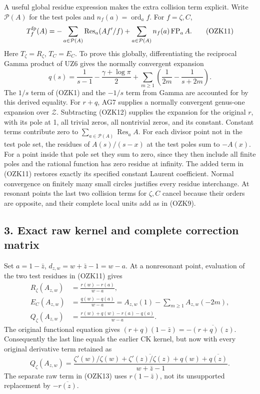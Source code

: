 \documentclass[
  10pt,
  a4paper,
]{article}
\begin{document}
A useful global residue expression makes the extra collision term
explicit. Write \(\mathcal P(A)\) for the test poles and
\(n_f(a)=\operatorname{ord}_a f\). For \(f=\zeta,C\), \[
T_f^{\rm fp}(A)
=-\sum_{a\in\mathcal P(A)}\operatorname{Res}_a(Af'/f)
+\sum_{a\in\mathcal P(A)}n_f(a)\operatorname{FP}_aA.
\tag{OZK11}
\] Here \(T_\zeta=R_\zeta\), \(T_C=E_C\). To prove this globally,
differentiating the reciprocal Gamma product of UZ6 gives the normally
convergent expansion \[
q(s)=\frac1{s-1}-\frac{\gamma+\log\pi}{2}
 +\sum_{m\ge1}\left(\frac1{2m}-\frac1{s+2m}\right).
\tag{OZK12}
\] The \(1/s\) term of (OZK1) and the \(-1/s\) term from Gamma are
accounted for by this derived equality. For \(r+q\), AG7 supplies a
normally convergent genus-one expansion over \(\mathcal Z\). Subtracting
(OZK12) supplies the expansion for the original \(r\), with its pole at
1, all trivial zeros, all nontrivial zeros, and its constant. Constant
terms contribute zero to
\(\sum_{a\in\mathcal P(A)}\operatorname{Res}_a A\). For each divisor
point not in the test pole set, the residues of \(A(s)/(s-x)\) at the
test poles sum to \(-A(x)\). For a point inside that pole set they sum
to zero, since they then include all finite poles and the rational
function has zero residue at infinity. The added term in (OZK11)
restores exactly its specified constant Laurent coefficient. Normal
convergence on finitely many small circles justifies every residue
interchange. At resonant points the last two collision terms for
\(\zeta,C\) cancel because their orders are opposite, and their complete
local units add as in (OZK9).

\subsection{3. Exact raw kernel and complete correction
matrix}\label{exact-raw-kernel-and-complete-correction-matrix}

Set \(a=1-\bar z\), \(d_{z,w}=w+\bar z-1=w-a\). At a nonresonant point,
evaluation of the two test residues in (OZK11) gives \[
\begin{aligned}
R_\zeta(A_{z,w})&=\frac{r(w)-r(a)}{w-a},\\
E_C(A_{z,w})&=\frac{q(w)-q(a)}{w-a}
=A_{z,w}(1)-\sum_{m\ge1}A_{z,w}(-2m),\\
Q_\zeta(A_{z,w})&=
\frac{r(w)+q(w)-r(a)-q(a)}{w-a}.
\end{aligned}\tag{OZK13}
\] The original functional equation gives
\((r+q)(1-\bar z)=-\overline{(r+q)(z)}\). Consequently the last line
equals the earlier CK kernel, but now with every original derivative
term retained as \[
Q_\zeta(A_{z,w})=
\frac{\zeta'(w)/\zeta(w)+\overline{\zeta'(z)/\zeta(z)}
+q(w)+\overline{q(z)}}{w+\bar z-1}.
\tag{OZK14}
\] The separate raw term in (OZK13) uses \(r(1-\bar z)\), not its
unsupported replacement by \(-\overline{r(z)}\).
\end{document}
